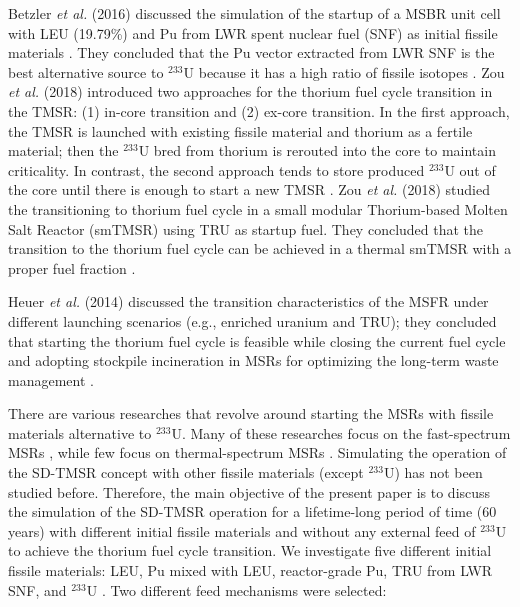 Betzler \emph{et al.} (2016) discussed the simulation of the startup of a \gls{MSBR} unit
cell with \gls{LEU} (19.79\%) and Pu from \gls{LWR} spent nuclear fuel (SNF) as initial
fissile materials \cite{betzler2016modeling}. They concluded that the 
Pu vector extracted from LWR SNF is the best alternative source to 
$^{233}$U because it has a high ratio of fissile isotopes
\cite{betzler2016modeling}. Zou \emph{et al.} (2018) introduced two approaches for
the thorium fuel cycle transition in the \gls{TMSR}: (1) in-core transition and 
(2) ex-core transition. In the first approach, the TMSR is launched with 
existing fissile material and thorium as a fertile material; then the 
$^{233}$U bred from thorium is rerouted into the core to maintain criticality. 
In contrast, the second approach tends to store produced $^{233}$U out of the 
core until there is enough to start a new TMSR \cite{zou2018transition}.
Zou \emph{et al.} (2018) studied the transitioning to thorium fuel
cycle in a small modular Thorium-based Molten Salt Reactor (smTMSR) using \gls{TRU}
as startup fuel. They concluded that the transition to the thorium fuel cycle can
be achieved in a thermal smTMSR with a proper fuel fraction 
\cite{zou2018preliminary}.

Heuer \emph{et al.} (2014) discussed the transition characteristics of the \gls{MSFR}
under different launching scenarios (e.g., enriched uranium and TRU); they concluded that starting the thorium fuel cycle is feasible while closing the current fuel cycle and adopting stockpile incineration in MSRs for optimizing the long-term waste management \cite{heuer2014towards}.

There are various researches that revolve around starting the
\glspl{MSR} with fissile materials alternative to $^{233}$U. Many of these
researches focus on the fast-spectrum \glspl{MSR} \cite{heuer2014towards,ashraf2019modeling,
	ashraf2018nuclear, rykhlevskii_fuel_2019, betzler_impacts_2019,
	fiorina2013investigation}, while few focus on
thermal-spectrum \glspl{MSR} \cite{betzler2016modeling,
	zou2018transition,zou2018preliminary}. Simulating the operation of the \gls{SD-TMSR} concept with other
fissile materials (except $^{233}$U) has not been studied before. Therefore,
the main objective of the present paper is to discuss the simulation of the
\gls{SD-TMSR} operation for a lifetime-long period of time (60 years) with
different initial fissile materials and without any external feed of $^{233}$U
to achieve the thorium fuel cycle transition. We investigate five different
initial fissile materials: \gls{LEU}, Pu mixed with \gls{LEU}, reactor-grade Pu, \gls{TRU} from LWR SNF, and $^{233}$U \cite{de2000scenarios}. Two different feed mechanisms were selected:

